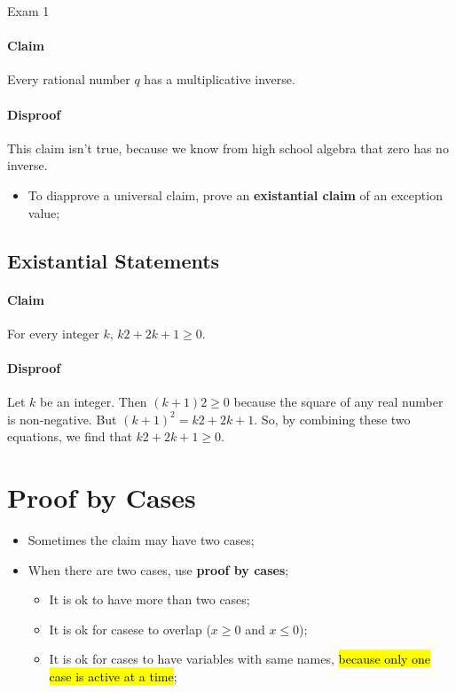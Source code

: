 \documentclass{note}
\begin{document}
\begin{note}{Exam 1}
        \paragraph{Claim} Every rational number $ q $ has a multiplicative inverse.
        \paragraph{Disproof} This claim isn’t true, because we know from high school algebra that zero has no inverse.
        \begin{itemize}
            \item To diapprove a universal claim, prove an \textbf{existantial claim} of an exception value;
        \end{itemize}

        \subsection{Existantial Statements}

        \paragraph{Claim}For every integer $ k $, $ k2 +2k+1≥0 $.
        \paragraph{Disproof} Let $ k $ be an integer. Then $ (k + 1)2 \geq 0 $
        because the square of any real number is non-negative. But $ (k+1)^{2} = k2 +2k+1 $.
        So, by combining these two equations, we find that $ k2 + 2k + 1 \geq 0 $.

        \section{Proof by Cases}

        \begin{itemize}
            \item Sometimes the claim may have two cases;
            \item When there are two cases, use \textbf{proof by cases};
            \begin{itemize}
                \item It is ok to have more than two cases;
                \item It is ok for casese to overlap ($ x \geq 0 $ and $ x \leq 0 $);
                \item It is ok for cases to have variables with same names, \hl{because only
                one case is active at a time};
            \end{itemize}
        \end{itemize}


\end{note}
\end{document}
